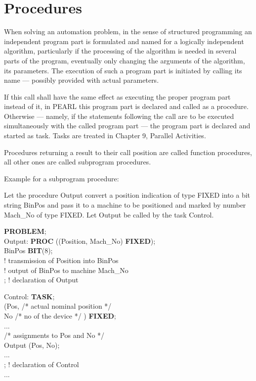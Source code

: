 \chapter{Procedures}   %

When solving an automation problem, in the sense of structured
programming an independent program part is formulated and named for a
logically independent algorithm, particularly if the processing of the
algorithm is needed in several parts of the program, eventually only
changing the arguments of the algorithm, its parameters. The execution
of such a program part is initiated by calling its name --- possibly
provided with actual parameters.

If this call shall have the same effect as executing the proper program
part instead of it, in PEARL this program part is declared and called
as a procedure. Otherwise --- namely, if the statements following the
call are to be executed simultaneously with the called program part ---
the program part is declared and started as task. Tasks are treated in
Chapter 9, Parallel Activities.

Procedures returning a result to their call position are called function
procedures, all other ones are called subprogram procedures.

Example for a subprogram procedure:

Let the procedure Output convert a position indication of type FIXED
into a bit string BinPos and pass it to a machine to be positioned and
marked by number Mach\_No of type FIXED. Let Output be called by
the task Control.

{\bf PROBLEM};\\
\x Output: {\bf PROC} ((Position, Mach\_No) {\bf FIXED});\\
\x {} BinPos {\bf BIT}(8);\\
\x \x ! transmission of Position into BinPos\\
\x \x ! output of BinPos to machine Mach\_No \\
\x {}; ! declaration of Output

\x Control: {\bf TASK};\\
\x {} (Pos, /* actual nominal position */ \\
\x \x \x         No   /* no of the device */ ) {\bf FIXED};\\
\x \x ... \\
\x \x /* assignments to Pos and No */ \\
\x {} Output (Pos, No); \\
\x \x ... \\
\x {}; ! declaration of Control \\
\x ...

